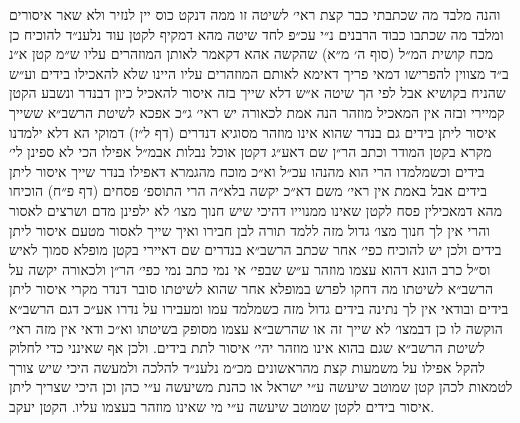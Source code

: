 \documentclass[12pt, openany]{book}
\begin{document}
\begin{multicols}{2}
והנה מלבד מה שכתבתי כבר קצת ראי׳ לשיטה זו ממה דנקט כוס יין לנזיר ולא שאר איסורים ומלבד מה שכתבו כבוד הרבנים נ״י עכ״פ לחד שיטה מהא דמקיף לקטן עוד נלענ״ד להוכיח כן מכח קושית המ״ל (סוף ה׳ מ״א) שהקשה אהא דקאמר לאותן המוזהרים עליו ש״מ קטן א״נ ב״ד מצווין להפרישו דמאי פריך דאימא לאותם המוזהרים עליו היינו שלא להאכילו בידים וע״ש שהניח בקושיא אבל לפי הך שיטה א״ש דלא שייך בזה איסור להאכיל כיון דבנדר ונשבע הקטן קמיירי ובזה אין המאכיל מוזהר הנה אמת לכאורה יש ראי׳ ג״כ אפכא לשיטת הרשב״א ששייך איסור ליתן בידים גם בנדר שהוא אינו מוזהר מסוגיא דנדרים (דף ל״ז) דמוקי הא דלא ילמדנו מקרא בקטן המודר וכתב הר״ן שם דאע״ג דקטן אוכל נבלות אבמ״ל אפילו הכי לא ספינן לי׳ בידים וכשמלמדו הרי הוא מהנהו עכ״ל וא״כ מוכח מהגמרא דאפילו בנדר שייך איסור ליתן בידים אבל באמת אין ראי׳ משם דא״כ יקשה בלא״ה הרי התוספ׳ פסחים (דף פ״ח) הוכיחו מהא דמאכילין פסח לקטן שאינו ממנוייו דהיכי שיש חנוך מצו׳ לא ילפינן מדם ושרצים לאסור והרי אין לך חנוך מצו׳ גדול מזה ללמד תורה לבן חבירו ואיך שייך לאסור מטעם איסור ליתן בידים ולכן יש להוכיח כפי׳ אחר שכתב הרשב״א בנדרים שם דאיירי בקטן מופלא סמוך לאיש וס״ל כרב הונא דהוא עצמו מוזהר ע״ש שבפי׳ אי נמי כתב נמי כפי׳ הר״ן ולכאורה יקשה על הרשב״א לשיטתו מה דחקו לפרש במופלא אחר שהוא לשיטתו סובר דנדר מקרי איסור ליתן בידים ובודאי אין לך נתינה בידים גדול מזה כשמלמד עמו ומעבירו על נדרו אע״כ דגם הרשב״א הוקשה לו כן דבמצו׳ לא שייך זה או שהרשב״א עצמו מסופק בשיטתו וא״כ ודאי אין מזה ראי׳ לשיטת הרשב״א שגם בהוא אינו מוזהר יהי׳ איסור לתת בידים. ולכן אף שאינני כדי לחלוק להקל אפילו על משמעות קצת מהראשונים מכ״מ נלענ״ד להלכה ולמעשה היכי שיש צורך לטמאות לכהן קטן שמוטב שיעשה ע״י ישראל או כהנת משיעשה ע״י כהן וכן היכי שצריך ליתן איסור בידים לקטן שמוטב שיעשה ע״י מי שאינו מוזהר בעצמו עליו. הקטן יעקב.\\\vspace{0pt}

\end{multicols}\newpage
\end{document}

